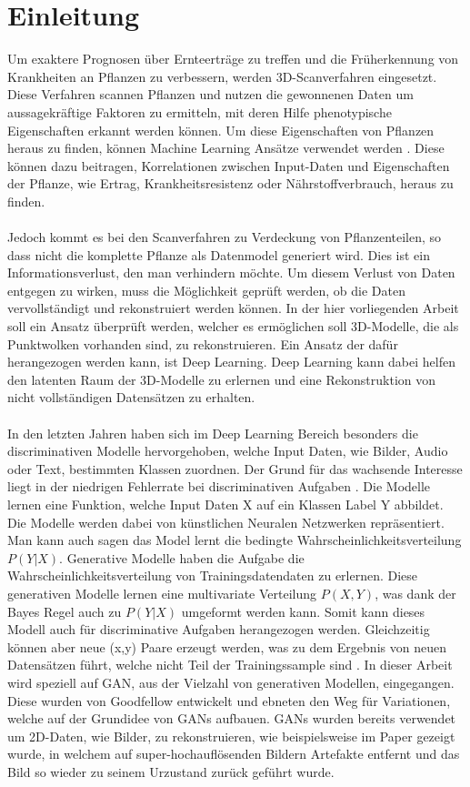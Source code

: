 \documentclass{llncs}
\begin{document}
\section{Einleitung}\label{einleitung}
Um exaktere Prognosen über Ernteerträge zu treffen und die Früherkennung von Krankheiten an Pflanzen zu verbessern, werden 3D-Scanverfahren eingesetzt. Diese Verfahren scannen Pflanzen und nutzen die gewonnenen Daten um aussagekräftige Faktoren zu ermitteln, mit deren Hilfe phenotypische Eigenschaften erkannt werden können. Um diese Eigenschaften von Pflanzen heraus zu finden, können Machine Learning Ansätze verwendet werden \cite{plants}. Diese können dazu beitragen, Korrelationen zwischen Input-Daten und Eigenschaften der Pflanze, wie Ertrag, Krankheitsresistenz oder Nährstoffverbrauch, heraus zu finden. 
\\\\
Jedoch kommt es bei den Scanverfahren zu Verdeckung von Pflanzenteilen, so dass nicht die komplette Pflanze als Datenmodel generiert wird. Dies ist ein Informationsverlust, den man verhindern möchte. Um diesem Verlust von Daten entgegen zu wirken, muss die Möglichkeit geprüft werden, ob die Daten vervollständigt und rekonstruiert werden können. In der hier vorliegenden Arbeit soll ein Ansatz überprüft werden, welcher es ermöglichen soll 3D-Modelle, die als Punktwolken vorhanden sind, zu rekonstruieren. Ein Ansatz der dafür herangezogen werden kann, ist Deep Learning. Deep Learning kann dabei helfen den latenten Raum der 3D-Modelle zu erlernen und eine Rekonstruktion von nicht vollständigen Datensätzen zu erhalten. 
\\\\
In den letzten Jahren haben sich im Deep Learning Bereich besonders die discriminativen Modelle hervorgehoben, welche Input Daten, wie Bilder, Audio oder Text, bestimmten Klassen zuordnen. Der Grund für das wachsende Interesse liegt in der niedrigen Fehlerrate bei discriminativen Aufgaben \cite{goodfellow2014}. Die Modelle lernen eine Funktion, welche Input Daten X auf ein Klassen Label Y abbildet. Die Modelle werden dabei von künstlichen Neuralen Netzwerken repräsentiert. Man kann auch sagen das Model lernt die bedingte Wahrscheinlichkeitsverteilung $P(Y|X)$. Generative Modelle haben die Aufgabe die Wahrscheinlichkeitsverteilung von Trainingsdatendaten zu erlernen. Diese generativen Modelle lernen eine multivariate Verteilung $P(X,Y)$, was dank der Bayes Regel auch zu $P(Y|X)$ umgeformt werden kann. Somit kann dieses Modell auch für discriminative Aufgaben herangezogen werden. Gleichzeitig können aber neue (x,y) Paare erzeugt werden, was zu dem Ergebnis von neuen Datensätzen führt, welche nicht Teil der Trainingssample sind \cite{discrim}. In dieser Arbeit wird speziell auf GAN, aus der Vielzahl von generativen Modellen, eingegangen. Diese wurden von Goodfellow\cite{goodfellow2014} entwickelt und ebneten den Weg für Variationen, welche auf der Grundidee von GANs aufbauen. GANs wurden bereits verwendet um 2D-Daten, wie Bilder, zu rekonstruieren, wie beispielsweise im Paper \cite{imagere1} gezeigt wurde, in welchem auf super-hochauflösenden Bildern Artefakte entfernt und das Bild so wieder zu seinem Urzustand zurück geführt wurde.
\end{document}
